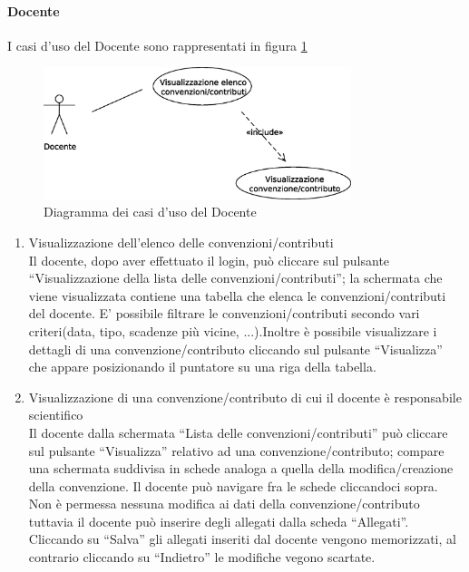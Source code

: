  
\paragraph{Docente}
I casi d'uso del Docente sono rappresentati in figura \ref{use_case_diag_teacher}
\begin{figure}[h]
  \caption{Diagramma dei casi d'uso del Docente}
  \label{use_case_diag_teacher}
  \centering
    \includegraphics[width=0.8\textwidth]{images/casi_uso_docente.eps}
\end{figure}

\begin{enumerate}
 
 \item Visualizzazione dell'elenco delle convenzioni/contributi\\
 
 Il docente, dopo aver effettuato il login, può cliccare sul pulsante ``Visualizzazione della lista delle convenzioni/contributi''; la schermata
 che viene visualizzata contiene una tabella che elenca le convenzioni/contributi del docente. E' possibile filtrare le convenzioni/contributi
 secondo vari criteri(data, tipo, scadenze più vicine, ...).Inoltre è possibile visualizzare i dettagli di una convenzione/contributo cliccando sul
 pulsante ``Visualizza'' che appare posizionando il puntatore su una riga della tabella.
 
 \item Visualizzazione di una convenzione/contributo di cui il docente è responsabile scientifico\\
 
 Il docente dalla schermata ``Lista delle convenzioni/contributi'' può cliccare sul pulsante ``Visualizza'' relativo ad una convenzione/contributo; compare una schermata suddivisa in schede analoga a quella della modifica/creazione
 della convenzione. Il docente può navigare fra le schede cliccandoci sopra. Non è permessa nessuna modifica ai dati della convenzione/contributo tuttavia il docente può inserire degli allegati dalla scheda ``Allegati''. Cliccando su ``Salva''
 gli allegati inseriti dal docente vengono memorizzati, al contrario cliccando su ``Indietro'' le modifiche vegono scartate.
 
 
 
\end{enumerate}



